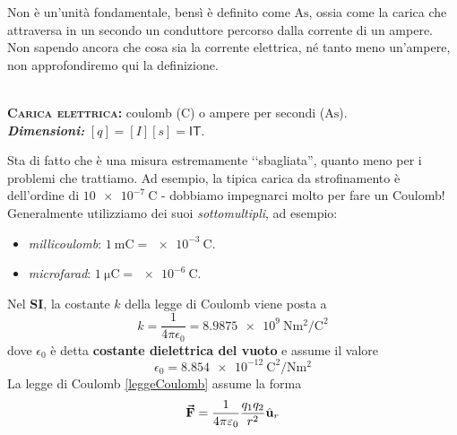 Non è un'unità fondamentale, bensì è definito come $\unit{\ampere\second}$, ossia come la carica che attraversa in un secondo un conduttore percorso dalla corrente di un ampere. Non sapendo ancora che cosa sia la corrente elettrica, né tanto meno un'ampere, non approfondiremo qui la definizione.
\begin{units}~\\
	\textbf{\textsc{Carica elettrica:}} coulomb  ($\unit{\coulomb}$) o ampere per secondi ($\unit{\ampere\second}$).\\
	\textit{\textbf{Dimensioni:}} $[q]=[I][s]=\mathsf{I}\mathsf{T}$.
\end{units}
Sta di fatto che è una misura estremamente ‘‘sbagliata'', quanto meno per i problemi che trattiamo. Ad esempio, la tipica carica da strofinamento è dell'ordine di $\SI{10e-7}{\coulomb}$ - dobbiamo impegnarci molto per fare un Coulomb! Generalmente utilizziamo dei suoi \textit{sottomultipli}, ad esempio:
\begin{itemize}
	\item \textit{millicoulomb}: $\SI[per-mode = fraction,exponent-product=\ensuremath{\cdot}]{1}{\milli\coulomb}=\SI[per-mode = fraction,exponent-product=\ensuremath{\cdot}]{e-3}{\coulomb}$.
	\item \textit{microfarad}: $\SI[per-mode = fraction,exponent-product=\ensuremath{\cdot}]{1}{\micro\coulomb}=\SI[per-mode = fraction,exponent-product=\ensuremath{\cdot}]{e-6}{\coulomb}$.
\end{itemize}
Nel \textbf{SI}, la costante $k$ della legge di Coulomb viene posta a
\begin{equation}
	k=\frac{1}{4\pi\epsilon_0}=\SI[per-mode = fraction,exponent-product=\ensuremath{\cdot}]{8,9875e9}{\newton\square\metre\per\square\coulomb}
\end{equation}
dove $\epsilon_0$ è detta \textbf{costante dielettrica del vuoto} e assume il valore
\begin{equation}
	\epsilon_0=\SI[per-mode = fraction,exponent-product=\ensuremath{\cdot}]{8,854e-12}{\square\coulomb\per\newton\square\metre}
\end{equation}
La legge di Coulomb \ref{leggeCoulomb} assume la forma
\begin{equation}
\vb*{\va{F}}=\frac{1}{4\pi\varepsilon_0}\frac{q_1q_2}{r^2}\hat{\mathbf{u}}_r
\end{equation}
